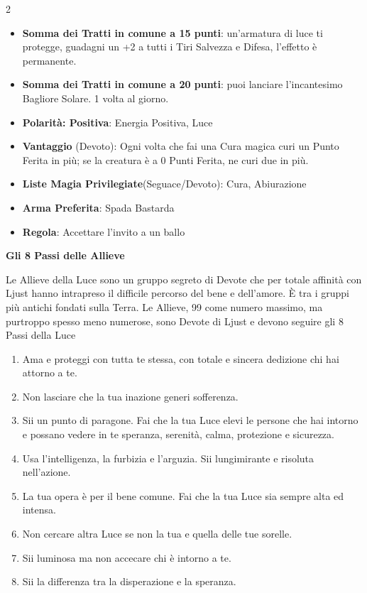 \begin{multicols}{2}
\begin{itemize}[leftmargin=*]
\item \textbf{Somma dei Tratti in comune a 15 punti}: un'armatura di luce ti protegge, guadagni un +2 a tutti i Tiri Salvezza e Difesa, l'effetto è permanente.
\item \textbf{Somma dei Tratti in comune a 20 punti}: puoi lanciare l'incantesimo Bagliore Solare. 1 volta al giorno.
\item \textbf{Polarità: Positiva}: Energia Positiva, Luce
\item \textbf{Vantaggio} (Devoto): Ogni volta che fai una Cura magica curi un Punto Ferita in più; se la creatura è a 0 Punti Ferita, ne curi due in più.
\item \textbf{Liste Magia Privilegiate}(Seguace/Devoto): Cura, Abiurazione
\item \textbf{Arma Preferita}: Spada Bastarda
\item \textbf{Regola}: Accettare l'invito a un ballo
\end{itemize}

\medskip

\textbf{Gli 8 Passi delle Allieve}

\medskip

Le Allieve della Luce sono un gruppo segreto di Devote che per totale affinità con Ljust hanno intrapreso il difficile percorso del bene e dell'amore. È tra i gruppi più antichi fondati sulla Terra. Le Allieve, 99 come numero massimo, ma purtroppo spesso meno numerose, sono Devote di Ljust e devono seguire gli 8 Passi della Luce

\begin{enumerate}[leftmargin=*] \setlength{\itemsep}{0pt}
\item Ama e proteggi con tutta te stessa, con totale e sincera dedizione chi hai attorno a te.
\item Non lasciare che la tua inazione generi sofferenza.
\item Sii un punto di paragone. Fai che la tua Luce elevi le persone che hai intorno e possano vedere in te speranza, serenità, calma, protezione e sicurezza.
\item Usa l'intelligenza, la furbizia e l'arguzia. Sii lungimirante e risoluta nell'azione.
\item La tua opera è per il bene comune. Fai che la tua Luce sia sempre alta ed intensa.
\item Non cercare altra Luce se non la tua e quella delle tue sorelle.
\item Sii luminosa ma non accecare chi è intorno a te.
\item Sii la differenza tra la disperazione e la speranza.
\end{enumerate}


\end{multicols}
